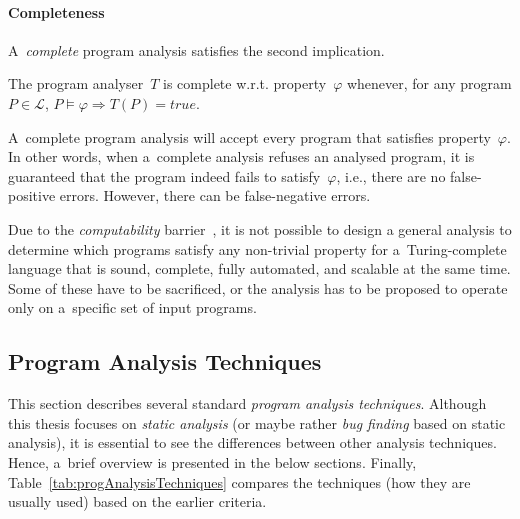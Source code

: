 \paragraph{Completeness}
A~\emph{complete} program analysis satisfies the second implication.
\begin{definition}
    The program analyser~$ T $ is complete w.r.t. property~$ \varphi $ whenever, for any program $ P \in \mathcal{L} $, $ P \models \varphi \Longrightarrow T(P) = true $.
\end{definition}
A~complete program analysis will accept every program that satisfies property~$ \varphi $. In other words, when a~complete analysis refuses an analysed program, it is guaranteed that the program indeed fails to satisfy~$ \varphi $, i.e., there are no false-positive errors. However, there can be false-negative errors.

Due to the \emph{computability} barrier~\cite{rice}, it is not possible to design a general analysis to determine which programs satisfy any non-trivial property for a~Turing-complete language that is sound, complete, fully automated, and scalable at the same time. Some of these have to be sacrificed, or the analysis has to be proposed to operate only on a~specific set of input programs.

\subsection{Program Analysis Techniques}
\label{sec:analysisTechniques}

This section describes several standard \emph{program analysis techniques}. Although this thesis focuses on \emph{static analysis} (or maybe rather \emph{bug finding} based on static analysis), it is essential to see the differences between other analysis techniques. Hence, a~brief overview is presented in the below sections. Finally, Table~\ref{tab:progAnalysisTechniques} compares the techniques (how they are usually used) based on the earlier criteria.

